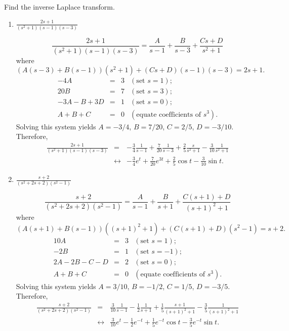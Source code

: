 \documentclass{ximera}
\begin{document}
\begin{problem}\label{exer:8.2.8}
 Find the inverse Laplace transform.
\begin{enumerate}
\item $\frac{2s+1}{(s^2+1)(s-1)(s-3)}$

\begin{solution}
$$
\frac{2s+1}{(s^2+1)(s-1)(s-3)}
=\frac{A}{s-1}+\frac{B}{s-3}+\frac{Cs+D}{s^2+1}
$$
where
$$
(A(s-3)+B(s-1))(s^2+1)+(Cs+D)(s-1)(s-3)=2s+1.
$$
$$
\begin{array}{rcrl}
-4A&=&3&(\mbox{set }s=1);\\
20B&=&7& (\mbox{set }s=3);\\
-3A-B+3D&=&1& (\mbox{set }s=0);\\
A+B+C&=&0&(\mbox{equate coefficients of }s^3).
\end{array}
$$
Solving this system yields $A=-3/4$, $B=7/20$,
$C=2/5$, $D=-3/10$. Therefore,
\begin{eqnarray*}
\frac{2s+1}{(s^2+1)(s-1)(s-3)}
&=&
-\frac{3}{4}\frac{1}{s-1}+\frac{7}{20}\frac{1}{s-3}+\frac{2}{5}\frac{s}{s^2+1}-\frac{3}{10}\frac{1}{s^2+1}
\\&\leftrightarrow&
-\frac{3}{4}e^t+\frac{7}{20}e^{3t}+\frac{2}{5}\cos t-\frac{3}{10}\sin t.
\end{eqnarray*}
\end{solution}

\item $\frac{s+2}{(s^2+2s+2)(s^2-1)}$



\begin{solution}
$$
\frac{s+2}{(s^2+2s+2)(s^2-1)}
=\frac{A}{s-1}+\frac{B}{s+1}+\frac{C(s+1)+D}{(s+1)^2+1}
$$
where
$$
(A(s+1)+B(s-1))((s+1)^2+1)+(C(s+1)+D)(s^2-1)=s+2.
$$
$$
\begin{array}{rcrl}
10A&=&3&(\mbox{set }s=1);\\
-2B&=&1& (\mbox{set }s=-1);\\
2A-2B-C-D&=&2& (\mbox{set }s=0);\\
A+B+C&=&0&(\mbox{equate coefficients of }s^3).
\end{array}
$$
Solving this system yields $A=3/10$, $B=-1/2$,
$C=1/5$, $D=-3/5$. Therefore,
\begin{eqnarray*}
\frac{s+2}{(s^2+2s+2)(s^2-1)}
&=&
\frac{3}{10}\frac{1}{s-1}-\frac{1}{2}\frac{1}{s+1}+\frac{1}{5}\frac{s+1}{(s+1)^2+1}
-\frac{3}{5}\frac{1}{(s+1)^2+1}
\\&\leftrightarrow&
\frac{3}{10}e^{t}-\frac{1}{2}e^{-t}
+\frac{1}{5}e^{-t}\cos t-\frac{3}{5}e^{-t}\sin t.
\end{eqnarray*}
\end{solution}


\end{enumerate}
\end{problem}
\end{document}
